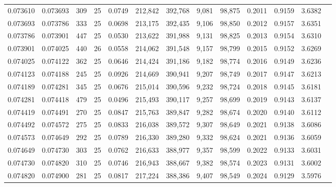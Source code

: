 \begin{tabular}{rrrrrrrrrrrrr}
0.073610 & 0.073693 &   309 &  25 &                                     0.0749 & 212,842 & 392,768 &   9,081 &  98,875 & 0.2011 & 0.9159 & 3.6382 \\
0.073693 & 0.073786 &   333 &  25 &                                     0.0698 & 213,175 & 392,435 &   9,106 &  98,850 & 0.2012 & 0.9157 & 3.6351 \\
0.073786 & 0.073901 &   447 &  25 &                                     0.0530 & 213,622 & 391,988 &   9,131 &  98,825 & 0.2013 & 0.9154 & 3.6310 \\
0.073901 & 0.074025 &   440 &  26 &                                     0.0558 & 214,062 & 391,548 &   9,157 &  98,799 & 0.2015 & 0.9152 & 3.6269 \\
0.074025 & 0.074122 &   362 &  25 &                                     0.0646 & 214,424 & 391,186 &   9,182 &  98,774 & 0.2016 & 0.9149 & 3.6236 \\
0.074123 & 0.074188 &   245 &  25 &                                     0.0926 & 214,669 & 390,941 &   9,207 &  98,749 & 0.2017 & 0.9147 & 3.6213 \\
0.074189 & 0.074281 &   345 &  25 &                                     0.0676 & 215,014 & 390,596 &   9,232 &  98,724 & 0.2018 & 0.9145 & 3.6181 \\
0.074281 & 0.074418 &   479 &  25 &                                     0.0496 & 215,493 & 390,117 &   9,257 &  98,699 & 0.2019 & 0.9143 & 3.6137 \\
0.074419 & 0.074491 &   270 &  25 &                                     0.0847 & 215,763 & 389,847 &   9,282 &  98,674 & 0.2020 & 0.9140 & 3.6112 \\
0.074492 & 0.074572 &   275 &  25 &                                     0.0833 & 216,038 & 389,572 &   9,307 &  98,649 & 0.2021 & 0.9138 & 3.6086 \\
0.074573 & 0.074649 &   292 &  25 &                                     0.0789 & 216,330 & 389,280 &   9,332 &  98,624 & 0.2021 & 0.9136 & 3.6059 \\
0.074649 & 0.074730 &   303 &  25 &                                     0.0762 & 216,633 & 388,977 &   9,357 &  98,599 & 0.2022 & 0.9133 & 3.6031 \\
0.074730 & 0.074820 &   310 &  25 &                                     0.0746 & 216,943 & 388,667 &   9,382 &  98,574 & 0.2023 & 0.9131 & 3.6002 \\
0.074820 & 0.074900 &   281 &  25 &                                     0.0817 & 217,224 & 388,386 &   9,407 &  98,549 & 0.2024 & 0.9129 & 3.5976 \\

\end{tabular}
